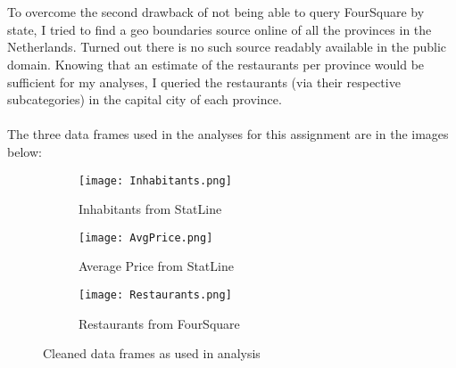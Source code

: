 \\\\
To overcome the second drawback of not being able to query FourSquare by state, I tried to find a geo boundaries source online of all the provinces in the Netherlands. Turned out there is no such source readably available in the public domain. Knowing that an estimate of the restaurants per province would be sufficient for my analyses, I queried the restaurants (via their respective subcategories) in the capital city of each province.
\\\\
The three data frames used in the analyses for this assignment are in the images below:
\medskip
\begin{figure}[h]
	\begin{subfigure}{0.33\textwidth}
		\texttt{[image: Inhabitants.png]} 
		\caption{Inhabitants from StatLine \cite{CBS1}}
	\end{subfigure}
	\begin{subfigure}{0.33\textwidth}
		\texttt{[image: AvgPrice.png]}
		\caption{Average Price from StatLine \cite{CBS2}}
	\end{subfigure}
	\begin{subfigure}{0.33\textwidth}
		\texttt{[image: Restaurants.png]}
		\caption{Restaurants from FourSquare \cite{FS2}}
	\end{subfigure}
\caption{Cleaned data frames as used in analysis}
\end{figure}